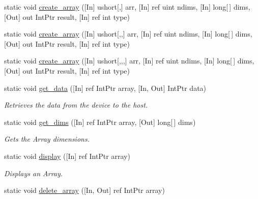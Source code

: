\begin{DoxyCompactItemize}
\item 
static void \mbox{\hyperlink{classkhiva_1_1interop_1_1_d_l_l_array_a0a5c1212455c38f6593a0ab201bd73d4}{create\+\_\+array}} (\mbox{[}In\mbox{]} ushort\mbox{[},\mbox{]} arr, \mbox{[}In\mbox{]} ref uint ndims, \mbox{[}In\mbox{]} long\mbox{[}$\,$\mbox{]} dims, \mbox{[}Out\mbox{]} out Int\+Ptr result, \mbox{[}In\mbox{]} ref int type)
\item 
static void \mbox{\hyperlink{classkhiva_1_1interop_1_1_d_l_l_array_a5a19d5961b39f9d32fa5ca01a84a6bc3}{create\+\_\+array}} (\mbox{[}In\mbox{]} ushort\mbox{[},,\mbox{]} arr, \mbox{[}In\mbox{]} ref uint ndims, \mbox{[}In\mbox{]} long\mbox{[}$\,$\mbox{]} dims, \mbox{[}Out\mbox{]} out Int\+Ptr result, \mbox{[}In\mbox{]} ref int type)
\item 
static void \mbox{\hyperlink{classkhiva_1_1interop_1_1_d_l_l_array_a6b20b48f2fb0361017739b96ffc45e29}{create\+\_\+array}} (\mbox{[}In\mbox{]} ushort\mbox{[},,,\mbox{]} arr, \mbox{[}In\mbox{]} ref uint ndims, \mbox{[}In\mbox{]} long\mbox{[}$\,$\mbox{]} dims, \mbox{[}Out\mbox{]} out Int\+Ptr result, \mbox{[}In\mbox{]} ref int type)
\item 
static void \mbox{\hyperlink{classkhiva_1_1interop_1_1_d_l_l_array_a985ee0561469c6c64809a041839b2768}{get\+\_\+data}} (\mbox{[}In\mbox{]} ref Int\+Ptr array, \mbox{[}In, Out\mbox{]} Int\+Ptr data)
\begin{DoxyCompactList}\small\item\em Retrieves the data from the device to the host. \end{DoxyCompactList}\item 
static void \mbox{\hyperlink{classkhiva_1_1interop_1_1_d_l_l_array_a92cd10bd1187d836be00d5ded15b4854}{get\+\_\+dims}} (\mbox{[}In\mbox{]} ref Int\+Ptr array, \mbox{[}Out\mbox{]} long\mbox{[}$\,$\mbox{]} dims)
\begin{DoxyCompactList}\small\item\em Gets the Array dimensions. \end{DoxyCompactList}\item 
static void \mbox{\hyperlink{classkhiva_1_1interop_1_1_d_l_l_array_a71bf7b23c2cb8191f3e05764bd4e36e6}{display}} (\mbox{[}In\mbox{]} ref Int\+Ptr array)
\begin{DoxyCompactList}\small\item\em Displays an Array.\end{DoxyCompactList}\item 
static void \mbox{\hyperlink{classkhiva_1_1interop_1_1_d_l_l_array_a03efeb6e247558a10abbd2f1878825b6}{delete\+\_\+array}} (\mbox{[}In, Out\mbox{]} ref Int\+Ptr array)

\end{DoxyCompactItemize}
